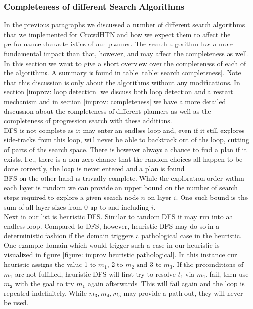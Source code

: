 \subsubsection{Completeness of different Search Algorithms}
\label{improv: search completeness}
In the previous paragraphs we discussed a number of different search algorithms that we implemented for CrowdHTN and how we expect them to affect the performance characteristics of our planner. The search algorithm has a more fundamental impact than that, however, and may affect the completeness as well. In this section we want to give a short overview over the completeness of each of the algorithms. A summary is found in table \ref{table: search completeness}. Note that this discussion is only about the algorithms without any modifications. In section \ref{improv: loop detection} we discuss both loop detection and a restart mechanism and in section \ref{improv: completeness} we have a more detailed discussion about the completeness of different planners as well as the completeness of progression search with these additions. \\
DFS is not complete as it may enter an endless loop and, even if it still explores side-tracks from this loop, will never be able to backtrack out of the loop, cutting of parts of the search space. There is however always a chance to find a plan if it exists. I.e., there is a non-zero chance that the random choices all happen to be done correctly, the loop is never entered and a plan is found. \\
BFS on the other hand is trivially complete. While the exploration order within each layer is random we can provide an upper bound on the number of search steps required to explore a given search node $n$ on layer $i$. One such bound is the sum of all layer sizes from 0 up to and including $i$. \\
Next in our list is heuristic DFS. Similar to random DFS it may run into an endless loop. Compared to DFS, however, heuristic DFS may do so in a deterministic fashion if the domain triggers a pathological case in the heuristic. One example domain which would trigger such a case in our heuristic is visualized in figure \ref{figure: improv heuristic pathological}.
In this instance our heuristic assigns the value 1 to $m_1$, 2 to $m_2$ and 3 to $m_3$. If the preconditions of $m_1$ are not fulfilled, heuristic DFS will first try to resolve $t_1$ via $m_1$, fail, then use $m_2$ with the goal to try $m_1$ again afterwards. This will fail again and the loop is repeated indefinitely. While $m_3, m_4, m_5$ may provide a path out, they will never be used. \\ 

